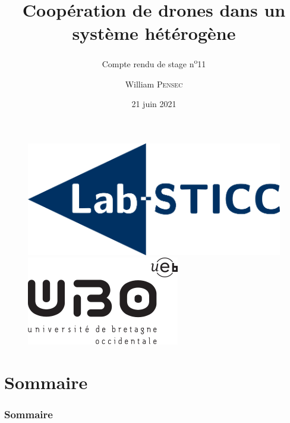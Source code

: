 \documentclass[12pt]{beamer}
\title[Compte rendu de stage n\textsuperscript{o}11]{Coopération de drones dans un système hétérogène}
\subtitle{Compte rendu de stage n\textsuperscript{o}11}
\author{William \textsc{Pensec}}
\institute[Lab-STICC]{Lab-Sticc}
\date{21 juin 2021}
\begin{document}
	\begin{frame}
		\begin{titlepage}
			\begin{figure}[H]
				\centering
				\includegraphics[scale=.15]{labsticc.png}
				\hspace{3cm}
				\includegraphics[scale=.3]{ubo.png}
			\end{figure}
		\end{titlepage}
	\end{frame}
	
	\section*{Sommaire}
	\begin{frame}
		\frametitle{Sommaire}
		\begin{center}
			\tableofcontents
		\end{center}
	\end{frame}
\end{document}
